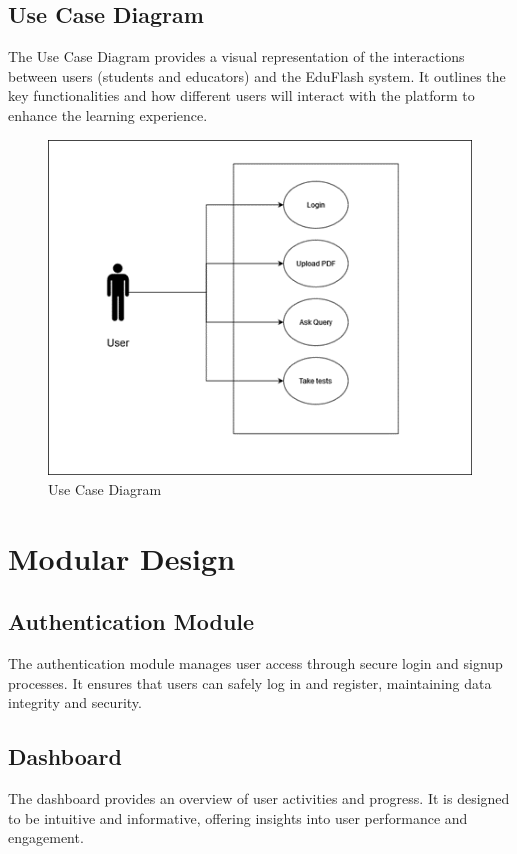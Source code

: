 \documentclass{report}
\begin{document}
\subsection{Use Case Diagram}
\Large
The Use Case Diagram provides a visual representation of the interactions between users (students and educators) and the EduFlash system. It outlines the key functionalities and how different users will interact with the platform to enhance the learning experience. \\
\begin{figure}[h]
    \centering
    \includegraphics[width=\textwidth]{usecasediagram.png}
    \caption{Use Case Diagram}
\end{figure}
\clearpage

\section{Modular Design}

\subsection{Authentication Module}
The authentication module manages user access through secure login and signup processes. It ensures that users can safely log in and register, maintaining data integrity and security.

\subsection{Dashboard}
The dashboard provides an overview of user activities and progress. It is designed to be intuitive and informative, offering insights into user performance and engagement.
\end{document}
